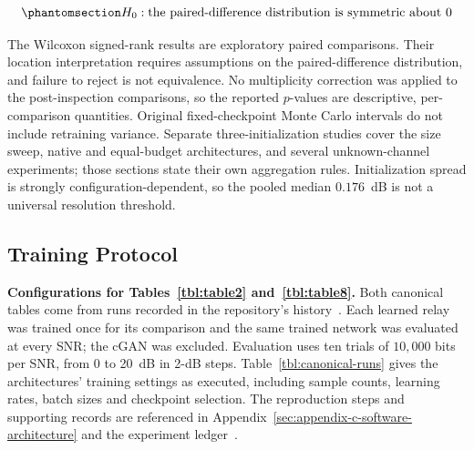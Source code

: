 \begin{equation}\protect\phantomsection\label{eq:wilcoxon-test}{H_0: \text{the paired-difference distribution is symmetric about }0
}\end{equation}

The Wilcoxon signed-rank results are exploratory paired comparisons. Their location interpretation requires assumptions on the paired-difference distribution, and failure to reject is not equivalence. No multiplicity correction was applied to the post-inspection comparisons, so the reported $p$-values are descriptive, per-comparison quantities. Original fixed-checkpoint Monte Carlo intervals do not include retraining variance. Separate three-initialization studies cover the size sweep, native and equal-budget architectures, and several unknown-channel experiments; those sections state their own aggregation rules. Initialization spread is strongly configuration-dependent, so the pooled median $0.176$~dB is not a universal resolution threshold.

\subsection{Training Protocol}\label{sec:training-protocol}

\textbf{Configurations for Tables~\ref{tbl:table2} and~\ref{tbl:table8}.} Both canonical tables come from runs recorded in the repository's history~. Each learned relay was trained once for its comparison and the same trained network was evaluated at every SNR; the cGAN was excluded. Evaluation uses ten trials of $10{,}000$ bits per SNR, from 0 to 20~dB in 2-dB steps. Table~\ref{tbl:canonical-runs} gives the architectures' training settings as executed, including sample counts, learning rates, batch sizes and checkpoint selection. The reproduction steps and supporting records are referenced in Appendix~\ref{sec:appendix-c-software-architecture} and the experiment ledger~.

